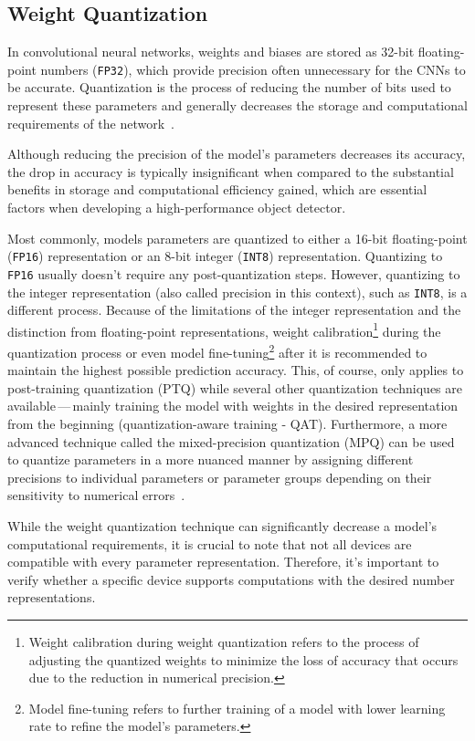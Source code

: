\subsection{Weight Quantization}

In convolutional neural networks, weights and biases are stored as 32-bit
floating-point numbers (\texttt{FP32}), which provide precision often
unnecessary for the CNNs to be accurate. Quantization is the process of reducing
the number of bits used to represent these parameters and generally decreases
the storage and computational requirements of the network~\cite{Choudhary2020}.

Although reducing the precision of the model's parameters decreases its
accuracy, the drop in accuracy is typically insignificant when compared to the
substantial benefits in storage and computational efficiency gained, which are
essential factors when developing a high-performance object detector.

Most commonly, models parameters are quantized to either a 16-bit floating-point
(\texttt{FP16}) representation or an 8-bit integer (\texttt{INT8})
representation. Quantizing to \texttt{FP16} usually doesn't require any
post-quantization steps. However, quantizing to the integer representation (also
called precision in this context), such as \texttt{INT8}, is a different
process. Because of the limitations of the integer representation and the
distinction from floating-point representations, weight
calibration\footnote{Weight calibration during weight quantization refers to the
process of adjusting the quantized weights to minimize the loss of accuracy that
occurs due to the reduction in numerical precision.} during the quantization
process or even model fine-tuning\footnote{Model fine-tuning refers to further
training of a model with lower learning rate to refine the model's parameters.}
after it is recommended to maintain the highest possible prediction accuracy.
This, of course, only applies to post-training quantization (PTQ) while several
other quantization techniques are available\,---\,mainly training the model with
weights in the desired representation from the beginning (quantization-aware
training - QAT). Furthermore, a more advanced technique called the
mixed-precision quantization (MPQ) can be used to quantize parameters in a more
nuanced manner by assigning different precisions to individual parameters or
parameter groups depending on their sensitivity to numerical
errors~\cite{Tang2022}.

While the weight quantization technique can significantly decrease a model's
computational requirements, it is crucial to note that not all devices are
compatible with every parameter representation. Therefore, it's important to
verify whether a specific device supports computations with the desired number
representations.

